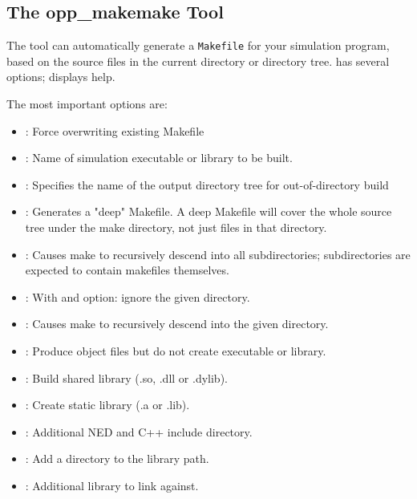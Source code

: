 \subsection{The opp\_makemake Tool}

The  tool can automatically generate a
\texttt{Makefile} for your simulation program, based on the source files
in the current directory or directory tree.
 has several options; 
displays help.

The most important options are:

\begin{itemize}
    \item{ : Force overwriting existing Makefile}
    \item{ : Name of simulation executable or library to be built.}
    \item{ : Specifies the name of the output directory tree
                          for out-of-directory build}
    \item{ : Generates a "deep" Makefile. A deep Makefile will
                          cover the whole source tree under the make directory,
                          not just files in that directory.}
    \item{ : Causes make to recursively descend into all subdirectories;
                          subdirectories are expected to contain
                          makefiles themselves.}
    \item{ :
                          With  and  option: ignore the given directory.}
    \item{ :
                          Causes make to recursively descend into the given
                          directory.}
    \item{ :  Produce object files but do not create executable or
                          library.}
    \item{ : Build shared library (.so, .dll or .dylib).}
    \item{ : Create static library (.a or .lib).}
    \item{ :         Additional NED and C++ include directory.}
    \item{ :         Add a directory to the library path.}
    \item{ :     Additional library to link against.}
\end{itemize}


